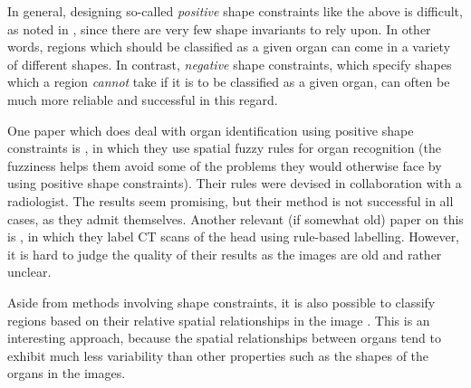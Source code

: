 In general, designing so-called \emph{positive} shape constraints like the above is difficult, as noted in \cite{kobashi95}, since there are very few shape invariants to rely upon. In other words, regions which should be classified as a given organ can come in a variety of different shapes. In contrast, \emph{negative} shape constraints, which specify shapes which a region \emph{cannot} take if it is to be classified as a given organ, can often be much more reliable and successful in this regard.

One paper which does deal with organ identification using positive shape constraints is \cite{lee03}, in which they use spatial fuzzy rules for organ recognition (the fuzziness helps them avoid some of the problems they would otherwise face by using positive shape constraints). Their rules were devised in collaboration with a radiologist. The results seem promising, but their method is not successful in all cases, as they admit themselves. Another relevant (if somewhat old) paper on this is \cite{cosic97}, in which they label CT scans of the head using rule-based labelling. However, it is hard to judge the quality of their results as the images are old and rather unclear.

Aside from methods involving shape constraints, it is also possible to classify regions based on their relative spatial relationships in the image \cite{atif07}. This is an interesting approach, because the spatial relationships between organs tend to exhibit much less variability than other properties such as the shapes of the organs in the images.
